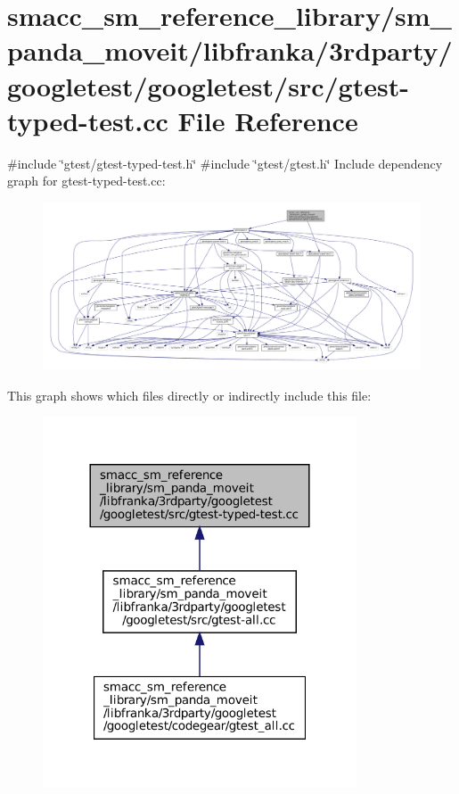 \hypertarget{gtest-typed-test_8cc}{}\section{smacc\+\_\+sm\+\_\+reference\+\_\+library/sm\+\_\+panda\+\_\+moveit/libfranka/3rdparty/googletest/googletest/src/gtest-\/typed-\/test.cc File Reference}
\label{gtest-typed-test_8cc}
{\ttfamily \#include \char`\"{}gtest/gtest-\/typed-\/test.\+h\char`\"{}}\newline
{\ttfamily \#include \char`\"{}gtest/gtest.\+h\char`\"{}}\newline
Include dependency graph for gtest-\/typed-\/test.cc\+:
\nopagebreak
\begin{figure}[H]
\begin{center}
\leavevmode
\includegraphics[width=350pt]{gtest-typed-test_8cc__incl}
\end{center}
\end{figure}
This graph shows which files directly or indirectly include this file\+:
\nopagebreak
\begin{figure}[H]
\begin{center}
\leavevmode
\includegraphics[width=264pt]{gtest-typed-test_8cc__dep__incl}
\end{center}
\end{figure}
